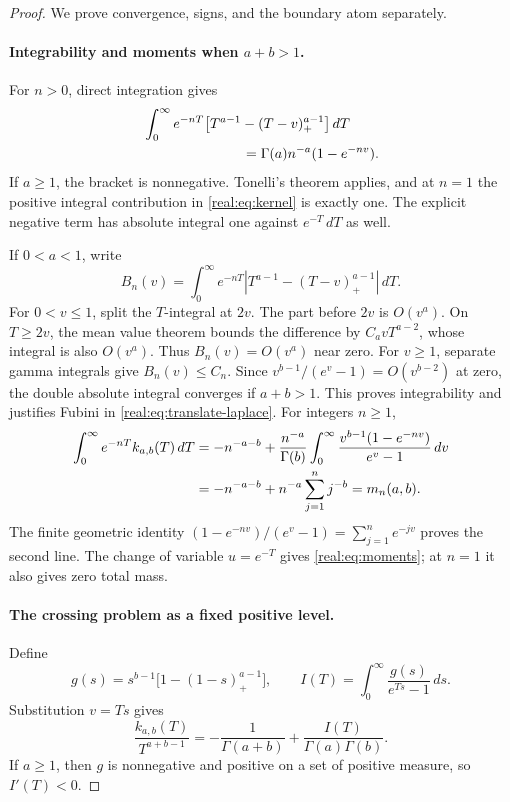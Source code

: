 \begin{proof}
We prove convergence, signs, and the boundary atom separately.

\paragraph{Integrability and moments when $a+b>1$.}
For $n>0$, direct integration gives
\begin{equation}\label{real:eq:translate-laplace}
\begin{split}
 &\int_0^\infty e^{-nT}
  \bigl[T^{a-1}-(T-v)_+^{a-1}\bigr]\,dT\\
 &\hspace{25mm}=\Gamma(a)n^{-a}(1-e^{-nv}).
\end{split}
\end{equation}
If $a\geq1$, the bracket is nonnegative. Tonelli's theorem applies,
and at $n=1$ the positive integral contribution in
\eqref{real:eq:kernel} is exactly one. The explicit negative term has
absolute integral one against $e^{-T}\,dT$ as well.

If $0<a<1$, write
\[
 B_n(v)=\int_0^\infty e^{-nT}
  \left|T^{a-1}-(T-v)_+^{a-1}\right|\,dT.
\]
For $0<v\leq1$, split the $T$-integral at $2v$. The part before
$2v$ is $O(v^a)$. On $T\geq2v$, the mean value theorem bounds the
difference by $C_a vT^{a-2}$, whose integral is also $O(v^a)$.
Thus $B_n(v)=O(v^a)$ near zero. For $v\geq1$, separate gamma
integrals give $B_n(v)\leq C_n$. Since
$v^{b-1}/(e^v-1)=O(v^{b-2})$ at zero, the double absolute integral
converges if $a+b>1$. This proves integrability and justifies Fubini
in \eqref{real:eq:translate-laplace}. For integers $n\geq1$,
\begin{align}
 \int_0^\infty e^{-nT}k_{a,b}(T)\,dT
 &=-n^{-a-b}+\frac{n^{-a}}{\Gamma(b)}
  \int_0^\infty\frac{v^{b-1}(1-e^{-nv})}{e^v-1}\,dv\notag\\
 &=-n^{-a-b}+n^{-a}\sum_{j=1}^n j^{-b}
 =m_n(a,b).\label{real:eq:moment-evaluation}
\end{align}
The finite geometric identity
$(1-e^{-nv})/(e^v-1)=\sum_{j=1}^n e^{-jv}$ proves the second line.
The change of variable $u=e^{-T}$ gives
\eqref{real:eq:moments}; at $n=1$ it also gives zero total mass.

\paragraph{The crossing problem as a fixed positive level.}
Define
\begin{equation}\label{real:eq:scaled-integral}
 g(s)=s^{b-1}\bigl[1-(1-s)_+^{a-1}\bigr],\qquad
 I(T)=\int_0^\infty\frac{g(s)}{e^{Ts}-1}\,ds.
\end{equation}
Substitution $v=Ts$ gives
\begin{equation}\label{real:eq:level}
 \frac{k_{a,b}(T)}{T^{a+b-1}}
 =-\frac1{\Gamma(a+b)}+\frac{I(T)}{\Gamma(a)\Gamma(b)}.
\end{equation}
If $a\geq1$, then $g$ is nonnegative and positive on a set of
positive measure, so $I'(T)<0$.


\end{proof}
